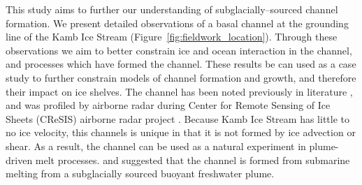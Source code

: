 This study aims to further our understanding of subglacially--sourced channel formation. We present detailed observations of a basal channel at the grounding line of the Kamb Ice Stream (Figure~\ref{fig:fieldwork_location}).  Through these observations we aim to better constrain ice and ocean interaction in the channel, and processes which have formed the channel. These results be can used as a case study to further constrain models of channel formation and growth, and therefore their impact on ice shelves. The channel has been noted previously in literature \citep{alley2016impacts,kim2016active,goeller2015subglacial,horgan2017poststagnation}, and was profiled by airborne radar during Center for Remote Sensing of Ice Sheets (CReSIS) airborne radar project \citep{arnold2020cresis}. Because Kamb Ice Stream has little to no ice velocity, this channels is unique in that it is not formed by ice advection or shear. As a result, the channel can be used as a natural experiment in plume-driven melt processes. \cite{kim2016active} and \cite{alley2016impacts} suggested that the channel is formed from submarine melting from a subglacially sourced buoyant freshwater plume.  

